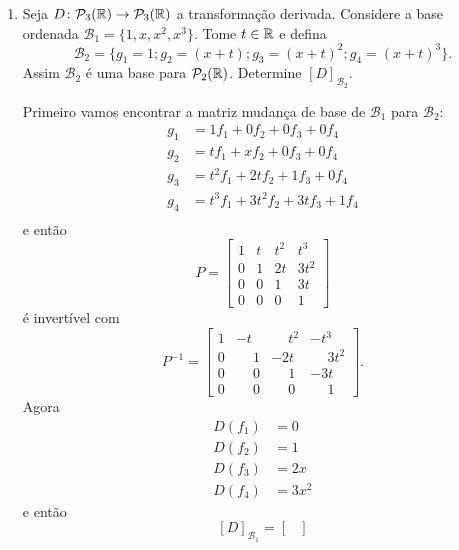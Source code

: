 \begin{exemplos}
\begin{enumerate}[label={\arabic*})]
        \item Seja $D \colon \mathcal{P}_3(\mathbb{R}) \to \mathcal{P}_3(\mathbb{R})$ a transformação derivada. Considere a base ordenada $\mathcal{B}_1 = \{1, x, x^2, x^3\}$. Tome $t \in \mathbb{R}$ e defina
        \[
            \mathcal{B}_2 = \{g_1 = 1; g_2 = (x + t); g_3 = (x + t)^2; g_4 = (x + t)^3\}.
        \]
        Assim $\mathcal{B}_2$ é uma base para $\mathcal{P}_2(\mathbb{R})$. Determine $[D]_{\mathcal{B}_2}$.
        \begin{solucao}
            Primeiro vamos encontrar a matriz mudança de base de $\mathcal{B}_1$ para $\mathcal{B}_2$:
            \begin{align*}
                g_1 &= 1f_1 + 0f_2 + 0f_3 + 0f_4\\
                g_2 &= tf_1 + xf_2 + 0f_3 + 0f_4\\
                g_3 &= t^2f_1 + 2tf_2 + 1f_3 + 0f_4\\
                g_4 &= t^3f_1 + 3t^2f_2 + 3tf_3 + 1f_4\\
            \end{align*}
            e então
            \[
                P = \begin{bmatrix}
                1 & t & t^2 & t^3\\
                0 & 1 & 2t & 3t^2\\
                0 & 0 & 1 & 3t\\
                0 & 0 & 0 & 1
                \end{bmatrix}
            \]
            é invertível com
            \[
                P^{-1} = \begin{bmatrix}
                1 & -t & \phantom{-}t^2 & -t^3\\
                0 & \phantom{-}1 & -2t & \phantom{-}3t^2\\
                0 & \phantom{-}0 & \phantom{-}1 & -3t\\
                0 & \phantom{-}0 & \phantom{-}0 & \phantom{-}1
                \end{bmatrix}.
            \]
            Agora
            \begin{align*}
                D(f_1) &= 0\\
                D(f_2) &= 1\\
                D(f_3) &= 2x\\
                D(f_4) &= 3x^2
            \end{align*}
            e então
            \[
                [D]_{\mathcal{B}_1} = \begin{bmatrix}

\end{bmatrix}\]
\end{solucao}
\end{enumerate}
\end{exemplos}
